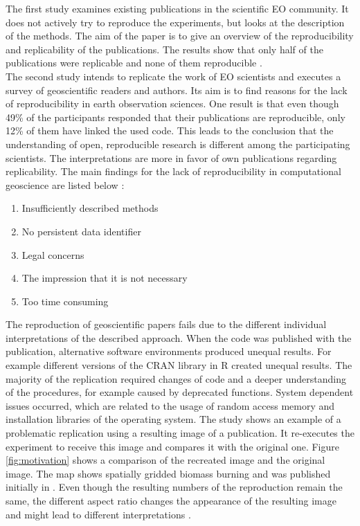 \documentclass[draft,final]{vutinfth} %
\newcommand{\bgoesswein}[1]{{\color{blue}#1}}
\begin{document}
The first study examines existing publications in the scientific EO community. It does not actively try to reproduce the experiments, but looks at the description of the methods. The aim of the paper is to give an overview of the reproducibility and replicability of the publications. The results show that only half of the publications were replicable and none of them reproducible \cite{Ostermann2017AdvancingSW}. \\
The second study intends to replicate the work of EO scientists and executes a survey of geoscientific readers and authors. Its aim is to find reasons for the lack of reproducibility in earth observation sciences. One result is that even though 49\% of the participants responded that their publications are reproducible, only 12\% of them have linked the used code. This leads to the conclusion that the understanding of open, reproducible research is different among the participating scientists. The interpretations are more in favor of own publications regarding replicability. The main findings for the lack of reproducibility in computational geoscience are listed below \cite{Thestateofreproducibility}:  

\begin{enumerate}
	\item Insufficiently described methods 
	\item No persistent data identifier
	\item Legal concerns
	\item The impression that it is not necessary
	\item Too \bgoesswein{t}ime consuming
\end{enumerate} 

The reproduction of geoscientific papers fails due to the different individual interpretations of the described approach. When the code was published with the publication, alternative software environments produced unequal results. For example different versions of the CRAN library in R created unequal results. The majority of the replication required changes of code and a deeper understanding of the procedures, for example caused by deprecated functions. System dependent issues occurred, which are related to the usage of random access memory and installation libraries of the operating system. 
The study shows an example of a problematic replication using a resulting image of a publication.
It re-executes the experiment to receive this image and compares it with the original one. Figure \ref{fig:motivation} shows a comparison of the recreated image and the original image. The map shows spatially gridded biomass burning and was published initially in \cite{bg-13-3225-2016}. Even though the resulting numbers of the reproduction remain the same, the different aspect ratio changes the appearance of the resulting image and might lead to different interpretations \cite{Thestateofreproducibility}.
\end{document}
